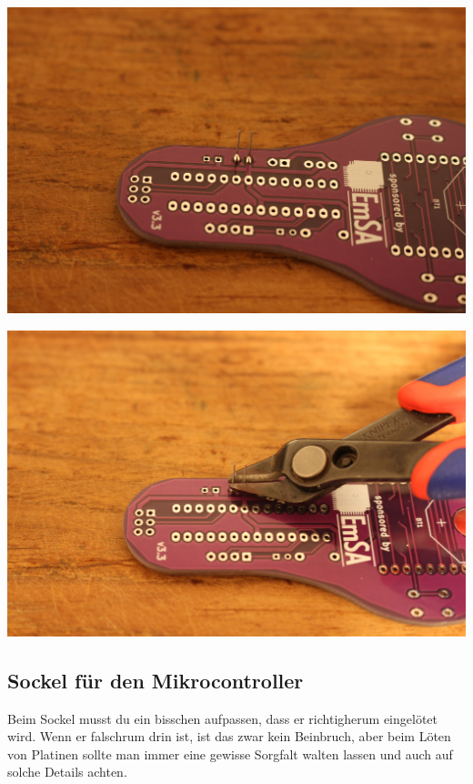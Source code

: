 \documentclass{article}
\begin{document}
\begin{minipage}[b]{0.5\textwidth}
	\includegraphics[width=\textwidth]{Bilder2024/IMG_0037.JPG}
\end{minipage}
\begin{minipage}[b]{0.5\textwidth}
	\includegraphics[width=\textwidth]{Bilder2024/IMG_0039.JPG}
\end{minipage}

\vspace{0.5cm}

\subsection{Sockel für den Mikrocontroller}

Beim Sockel musst du ein bisschen aufpassen, dass er richtigherum eingelötet wird. Wenn er falschrum drin ist, ist das zwar kein Beinbruch, aber beim Löten von Platinen sollte man immer eine gewisse Sorgfalt walten lassen und auch auf solche Details achten.
\end{document}
